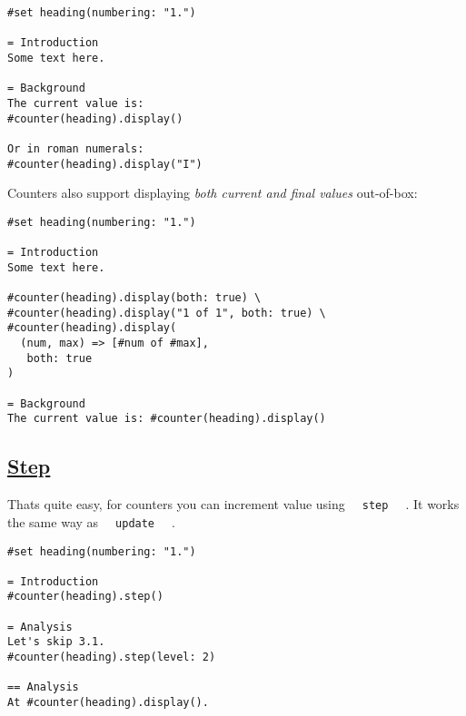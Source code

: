 \begin{verbatim}
#set heading(numbering: "1.")

= Introduction
Some text here.

= Background
The current value is:
#counter(heading).display()

Or in roman numerals:
#counter(heading).display("I")
\end{verbatim}

\pandocbounded{}

Counters also support displaying \emph{both current and final values}
out-of-box:

\begin{verbatim}
#set heading(numbering: "1.")

= Introduction
Some text here.

#counter(heading).display(both: true) \
#counter(heading).display("1 of 1", both: true) \
#counter(heading).display(
  (num, max) => [#num of #max],
   both: true
)

= Background
The current value is: #counter(heading).display()
\end{verbatim}

\pandocbounded{}

\subsection{\texorpdfstring{\hyperref[step]{Step}}{Step}}\label{step}

That\textquotesingle s quite easy, for counters you can increment value
using \texttt{\ }{\texttt{\ step\ }}\texttt{\ } . It works the same way
as \texttt{\ }{\texttt{\ update\ }}\texttt{\ } .

\begin{verbatim}
#set heading(numbering: "1.")

= Introduction
#counter(heading).step()

= Analysis
Let's skip 3.1.
#counter(heading).step(level: 2)

== Analysis
At #counter(heading).display().
\end{verbatim}

\pandocbounded{}

